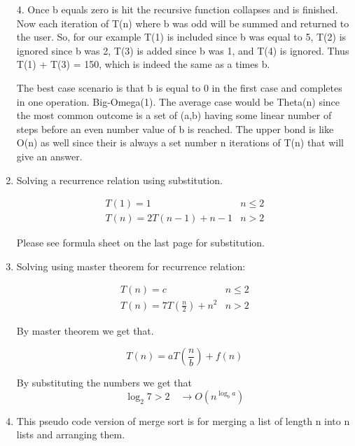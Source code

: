 \begin{enumerate}
 4. Once b equals zero is hit the recursive function collapses and is finished. Now each iteration of T(n) where b was odd will be summed and returned to the user. So, for our example T(1) is included since b was equal to 5, T(2) is ignored since b was 2, T(3) is added since b was 1, and T(4) is ignored. Thus T(1) + T(3) = 150, which is indeed the same as a times b.  
 
 The best case scenario is that b is equal to 0 in the first case and completes in one operation. Big-Omega(1). The average case would be Theta(n) since the most common outcome is a set of (a,b) having some linear number of steps before an even number value of b is reached. The upper bond is like O(n) as well since their is always a set number n iterations of T(n) that will give an answer.  
 


 \item Solving a recurrence relation using substitution. 
 
\begin{equation}
\begin{array}{ll}
T(1)=1 & n \leqslant 2 \\
T(n)=2 T(n-1)+n-1 & n>2
\end{array}
\end{equation}

Please see formula sheet on the last page for substitution. 

\item Solving using master theorem for recurrence relation:

\begin{equation}
\begin{array}{ll}
T(n)=c & n \leq 2 \\
T(n)=7 T\left(\frac{n}{2}\right)+n^{2} & n > 2
\end{array}
\end{equation}

By master theorem we get that.

\begin{equation}
T(n)=a T\left(\frac{n}{b}\right)+f(n)
\end{equation}

By substituting the numbers we get that
\begin{equation}
\log _{2} 7>2 \quad \rightarrow O\left(n^{\log _{b} a}\right)
\end{equation}

\item This pseudo code version of merge sort is for merging a list of length n into n lists and arranging them. 


\end{enumerate}
